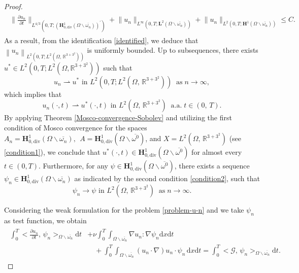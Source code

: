\documentclass[a4paper,12pt,reqno,natbib]{amsart}
\newcommand{\dx} {\displaystyle\mathrm{d}x}
\newcommand{\dt} {\displaystyle\mathrm{d}t}
\def\H{\textbf{H}}
\def\L{\textbf{L}}
\begin{document}
\begin{proof}
\begin{align}\label{estimation-u-omega-1}
\begin{split}
\big\|\frac{\partial u_n}{\partial t}\big\|_{L^{4/3}(0,T;(\H^1_{0,\text{div}}(\Omega\backslash\overline{\omega_n}))^\prime)}+\big\|u_n\big\|_{L^\infty(0,T;\L^2(\Omega\backslash\overline{\omega_n}))}+\big\|u_n\big\|_{ L^2(0,T;\H^1(\Omega\backslash\overline{\omega_n}))}\leq
C.
\end{split}
\end{align}
As a result, from the identification \eqref{identified}, we deduce that $\left\|u_n\right\|_{L^2(0,T;L^2(\Omega,\, \mathbb{R}^{3+3^2}))}$ is uniformly bounded. Up to subsequences, there exists $u^* \in L^2(0,T;L^2(\Omega, \mathbb{R}^{3+3^2}))$ such that
%
\begin{equation}\label{cv-identified}
u_n \rightharpoonup u^* \text { in } L^2(0,T;L^2(\Omega, \,\mathbb{R}^{3+3^2}))\;\;\text{as}\;n\rightarrow\infty,
\end{equation}
which implies that
\begin{equation}\label{cv-identified-new}
u_n(\cdot,t) \rightharpoonup u^*(\cdot,t) \text { in } L^2(\Omega, \,\mathbb{R}^{3+3^2})\;\;\text{a.a.}\; t\in(0,\,T).
\end{equation}
By applying Theorem \ref{Mosco-convergence-Sobolev} and utilizing the first condition of Mosco convergence for the spaces $A_n=\H^1_{0,\text{div}}(\Omega\backslash\overline{\omega_n}),\;\, A=\H^1_{0,\text{div}}(\Omega\backslash\overline{\omega^0})$, and $X=L^2(\Omega,\, \mathbb{R}^{3+3^2})$ (see \eqref{condition1}), we conclude that $u^*(\cdot,t) \in \H^1_{0,\text{div}}(\Omega\backslash\overline{\omega^0})$ for almost every  $t\in(0,T).$ Furthermore, for any $\psi \in \H^1_{0,\text{div}}(\Omega\backslash\overline{\omega^0})$, there exists a sequence $\psi_n\in \H^1_{0,\text{div}}(\Omega\backslash\overline{\omega_n})$ as indicated by the second condition \eqref{condition2}, such that
\begin{equation}
    \label{cv-s0}\psi_n \rightarrow \psi \text { in } L^2\left(\Omega,\, \mathbb{R}^{3+3^2}\right)\;\;\text{as}\;n\rightarrow\infty.
\end{equation}


\noindent Considering the weak formulation for the problem \eqref{problem-u-n} and we take $\psi_n$ as test function, we obtain
\begin{align}\label{weak-2-2}
\begin{split}
\displaystyle \int_0^T\big<\frac{\partial u_n}{\partial t},\, \psi_n \big>_{\Omega\backslash\overline{\omega_n}}\dt&+\nu \int_0^T\int_{\Omega\backslash\overline{\omega_n}}\nabla u_n :\nabla \psi_n \dx\dt\\
&\quad+ \int_0^T\int_{\Omega\backslash\overline{\omega_n}} (u_n\cdot \nabla) u_n \cdot \psi_n\, \dx\dt=\int_0^T\big< \mathcal{G},\, \psi_n \big>_{\Omega\backslash\overline{\omega_n}}\dt.
\end{split}
\end{align}



\end{proof}
\end{document}
